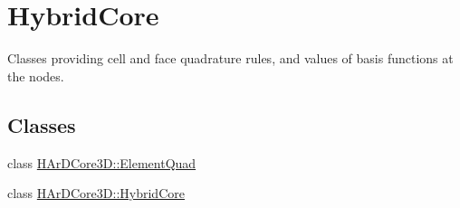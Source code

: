 \hypertarget{group__HybridCore}{}\section{Hybrid\+Core}
\label{group__HybridCore}


Classes providing cell and face quadrature rules, and values of basis functions at the nodes.  


\subsection*{Classes}
\begin{DoxyCompactItemize}
\item 
class \hyperlink{classHArDCore3D_1_1ElementQuad}{H\+Ar\+D\+Core3\+D\+::\+Element\+Quad}
\item 
class \hyperlink{classHArDCore3D_1_1HybridCore}{H\+Ar\+D\+Core3\+D\+::\+Hybrid\+Core}
\end{DoxyCompactItemize}
